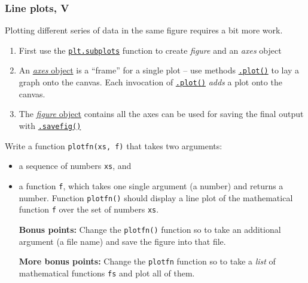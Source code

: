 \documentclass[english,serif,mathserif,xcolor=pdftex,dvipsnames,table]{beamer}
\begin{document}
\begin{frame}
  \frametitle{Line plots, V}
  Plotting different series of data in the same figure requires a bit more work.

  \begin{enumerate}
  \item
    First use the
    \href{http://matplotlib.org/api/pyplot_api.html\#matplotlib.pyplot.subplots}{\texttt{plt.subplots}}
    function to create \emph{figure} and an \emph{axes} object
  \item
    An
    \href{http://matplotlib.org/api/axes_api.html\#matplotlib.axes.Axes}{\emph{axes}
      object} is a ``frame'' for a single plot -- use methods
    \href{http://matplotlib.org/api/_as_gen/matplotlib.axes.Axes.plot.html\#matplotlib.axes.Axes.plot}{\texttt{.plot()}}
    to lay a graph onto the canvas. Each invocation of
    \href{http://matplotlib.org/api/_as_gen/matplotlib.axes.Axes.plot.html\#matplotlib.axes.Axes.plot}{\texttt{.plot()}}
    \emph{adds} a plot onto the canvas.
  \item
    The
    \href{http://matplotlib.org/api/figure_api.html\#matplotlib.figure.Figure}{\emph{figure}
      object} contains all the axes can be used for saving the final output
    with
    \href{http://matplotlib.org/api/figure_api.html\#matplotlib.figure.Figure.savefig}{\texttt{.savefig()}}
\end{enumerate}
\end{frame}


\begin{frame}
  \begin{exercise*}[3.D]
    Write a function \texttt{plotfn(xs, f)} that takes two arguments:
    \begin{itemize}
    \item a sequence of numbers \texttt{xs}, and
    \item a function \texttt{f}, which takes one single argument (a number) and
      returns a number.
    Function \texttt{plotfn()} should display a line plot of the mathematical
    function \texttt{f} over the set of numbers \texttt{xs}.

    \+ \textbf{Bonus points:} Change the \texttt{plotfn()} function so to take
    an additional argument (a file name) and save the figure into that file.

    \+ \textbf{More bonus points:} Change the \texttt{plotfn} function so to
    take a \emph{list} of mathematical functions \texttt{fs} and plot all of them.
    \end{itemize}
  \end{exercise*}
\end{frame}
\end{document}
